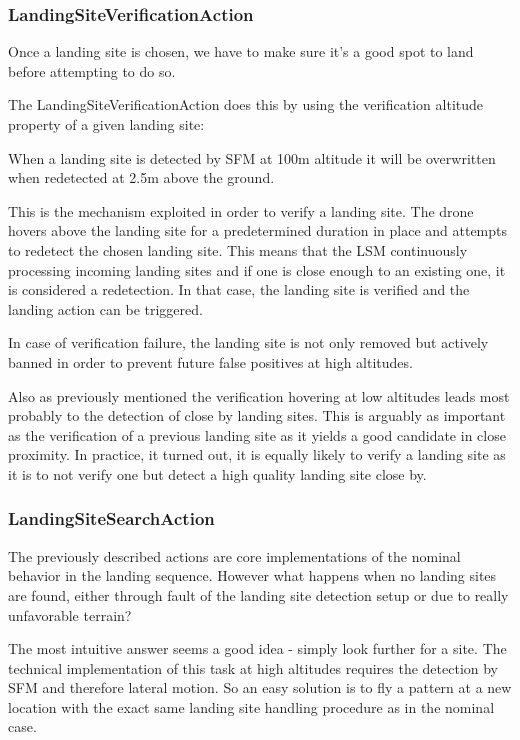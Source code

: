 \subsubsection{LandingSiteVerificationAction}

Once a landing site is chosen, we have to make sure it's a good spot to land before attempting to do so. 

The LandingSiteVerificationAction does this by using the verification altitude property of a given landing site:

When a landing site is detected by SFM at 100m altitude it will be overwritten when redetected at 2.5m above the ground. 

This is the mechanism exploited in order to verify a landing site. The drone hovers above the landing site for a predetermined duration in place and attempts to redetect the chosen landing site. This means that the LSM continuously processing incoming landing sites and if one is close enough to an existing one, it is considered a redetection. In that case, the landing site is verified and the landing action can be triggered.

In case of verification failure, the landing site is not only removed but actively banned in order to prevent future false positives at high altitudes.

Also as previously mentioned the verification hovering at low altitudes leads most probably to the detection of close by landing sites. This is arguably as important as the verification of a previous landing site as it yields a good candidate in close proximity. In practice, it turned out,  it is equally likely to verify a landing site as it is to not verify one but detect a high quality landing site close by.

\subsubsection{LandingSiteSearchAction}

The previously described actions are core implementations of the nominal behavior in the landing sequence. However what happens when no landing sites are found, either through fault of the landing site detection setup or due to really unfavorable terrain?

The most intuitive answer seems a good idea - simply look further for a site. The technical implementation of this task at high altitudes requires the detection by SFM and therefore lateral motion. So an easy solution is to fly a pattern at a new location with the exact same landing site handling procedure as in the nominal case.

